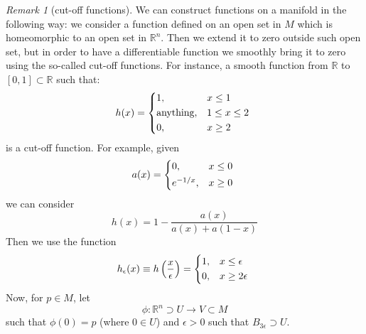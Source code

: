 \documentclass[a4paper,11pt,titlepage]{article}
\numberwithin{equation}{section}
\theoremstyle{definition}
\theoremstyle{remark}
\newtheorem{remark}[theorem]{Remark}
\newcommand{\rfield}{\mathbb{R}}
\begin{document}
\begin{remark}[cut-off functions]
  We can construct functions on a manifold in the following way: we consider a function defined on an open set in $M$ which is homeomorphic to an open set in $\rfield^n$. Then we extend it to zero outside such open set, but in order to have a differentiable function we smoothly bring it to zero using the so-called cut-off functions.
  For instance, a smooth function from $\rfield$ to $[0, 1] \subset \rfield$ such that:
  \begin{equation*}
    h(x) = \begin{cases*}
     1, & $x \le 1$ \\
     \text{anything}, &  $1 \le x \le 2$ \\
     0, & $x \ge 2$
  \end{cases*}
  \end{equation*}
  is a cut-off function.
  For example, given
  \begin{equation*}
    a(x) = \begin{cases*}
     0, & $x \le 0$ \\
     e^{-1/x}, & $x \ge 0$
  \end{cases*}
  \end{equation*}
  we can consider
  \begin{equation*}
    h(x) = 1 - \frac{a(x)}{a(x) + a(1-x)}
  \end{equation*}
  Then we use the function
  \begin{equation*}
    h_{\epsilon}(x) \equiv h \left (\frac{x}{\epsilon} \right) =
    \begin{cases*}
      1, & $x \le \epsilon$ \\
      0, & $x \ge 2 \epsilon$
    \end{cases*}
  \end{equation*}
  Now, for $p \in M$, let
  $$\phi \colon \rfield^n \supset U \rightarrow V \subset M$$
  such that $\phi(0) = p$ (where $0 \in U$) and $\epsilon > 0$ such that $B_{3 \epsilon} \supset U $. %

  \begin{figure}[H]
          \centering
\end{figure}
\end{remark}
\end{document}
